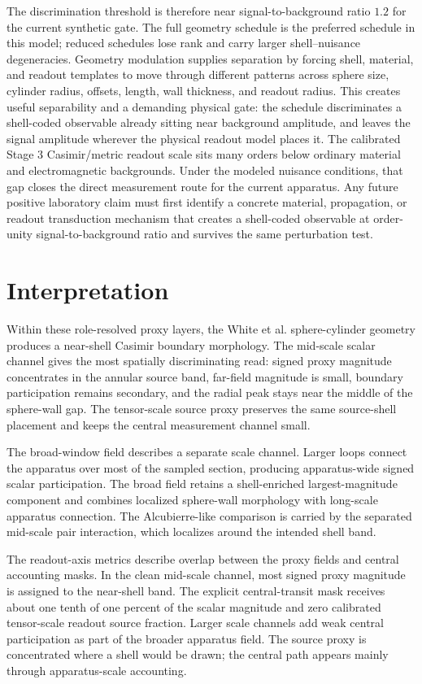 \documentclass[11pt]{article}
\begin{document}
The discrimination threshold is therefore near signal-to-background ratio
$1.2$ for the current synthetic gate. The full geometry schedule is the
preferred schedule in this model; reduced schedules lose rank and carry larger
shell--nuisance degeneracies. Geometry modulation supplies separation by
forcing shell, material, and readout templates to move through different
patterns across sphere size, cylinder radius, offsets, length, wall thickness,
and readout radius. This creates useful separability and a demanding physical gate:
the schedule discriminates a shell-coded observable already sitting near
background amplitude, and leaves the signal amplitude wherever the physical
readout model places it. The calibrated Stage 3 Casimir/metric readout scale
sits many orders below ordinary material and electromagnetic backgrounds.
Under the modeled nuisance conditions, that gap closes the direct measurement
route for the current apparatus. Any future positive laboratory claim must
first identify a concrete material, propagation, or readout transduction
mechanism that creates a shell-coded observable at order-unity
signal-to-background ratio and survives the same perturbation test.

\section{Interpretation}

Within these role-resolved proxy layers, the White et al. sphere-cylinder
geometry produces a near-shell Casimir boundary morphology. The mid-scale
scalar channel gives the most spatially discriminating read: signed proxy
magnitude concentrates in the annular source band, far-field magnitude is
small, boundary participation remains secondary, and the radial peak stays near
the middle of the sphere-wall gap. The tensor-scale source proxy preserves the
same source-shell placement and keeps the central measurement channel small.

The broad-window field describes a separate scale channel. Larger loops
connect the apparatus over most of the sampled section, producing
apparatus-wide signed scalar participation. The broad field retains a
shell-enriched largest-magnitude component and combines localized sphere-wall
morphology with long-scale apparatus connection. The Alcubierre-like comparison
is carried by the separated mid-scale pair interaction, which localizes around
the intended shell band.

The readout-axis metrics describe overlap between the proxy fields and central
accounting masks. In the clean mid-scale channel, most signed proxy magnitude
is assigned to the near-shell band. The explicit central-transit mask receives
about one tenth of one percent of the scalar magnitude and zero calibrated
tensor-scale readout source fraction. Larger scale channels add weak central
participation as part of the broader apparatus field. The source proxy is
concentrated where a shell would be drawn; the central path appears mainly
through apparatus-scale accounting.
\end{document}
